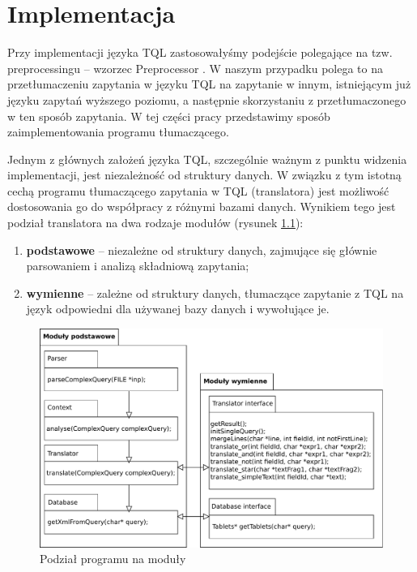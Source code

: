 \chapter{Implementacja}
Przy implementacji języka TQL zastosowałyśmy podejście polegające na tzw. preprocessingu -- wzorzec Preprocessor \cite{mernik}.
W naszym przypadku polega to na przetłumaczeniu zapytania w języku TQL na zapytanie w innym, istniejącym już języku zapytań wyższego poziomu,
a następnie skorzystaniu z przetłumaczonego w ten sposób zapytania. W tej części pracy przedstawimy sposób zaimplementowania programu tłumaczącego.

Jednym z głównych założeń języka TQL, szczególnie ważnym z punktu widzenia implementacji, jest niezależność od struktury danych.
W związku z tym istotną cechą programu tłumaczącego zapytania w TQL (translatora) jest możliwość dostosowania  
go do współpracy z różnymi bazami danych.
 Wynikiem tego jest podział translatora na dwa rodzaje modułów (rysunek \ref{moduly}):
\begin{enumerate}
 \item \textbf{podstawowe} -- niezależne od struktury danych, zajmujące się głównie parsowaniem i analizą składniową zapytania;
 \item \textbf{wymienne} -- zależne od struktury danych, tłumaczące zapytanie z TQL na język odpowiedni dla używanej bazy danych
i wywołujące je.
\end{enumerate}

\begin{figure}[h]
 \centering
 \includegraphics[width=450px]{../diagramy/pakiety.pdf}
 \caption{Podział programu na moduły}
 \label{moduly}
\end{figure}


